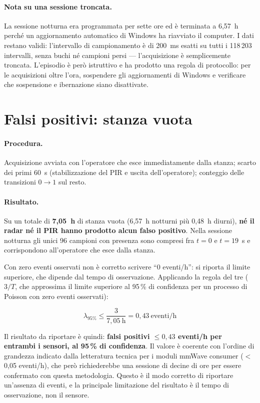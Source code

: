 \paragraph{Nota su una sessione troncata.} La sessione notturna era programmata per
sette ore ed è terminata a 6,57~h perché un aggiornamento automatico di Windows ha
riavviato il computer. I dati restano validi: l'intervallo di campionamento è di
200~ms esatti su tutti i 118\,203 intervalli, senza buchi né campioni persi ---
l'acquisizione è semplicemente troncata. L'episodio è però istruttivo e ha prodotto
una regola di protocollo: per le acquisizioni oltre l'ora, sospendere gli
aggiornamenti di Windows e verificare che sospensione e ibernazione siano disattivate.

\section{Falsi positivi: stanza vuota}
\label{sec:falsi-positivi}

\paragraph{Procedura.} Acquisizione avviata con l'operatore che esce immediatamente
dalla stanza; scarto dei primi 60~s (stabilizzazione del PIR e uscita
dell'operatore); conteggio delle transizioni $0 \to 1$ sul resto.

\paragraph{Risultato.} Su un totale di \textbf{7,05~h} di stanza vuota
(6,57~h notturni più 0,48~h diurni), \textbf{né il radar né il PIR hanno prodotto
alcun falso positivo}. Nella sessione notturna gli unici 96 campioni con presenza
sono compresi fra $t=0$ e $t=19$~s e corrispondono all'operatore che esce dalla
stanza.

Con zero eventi osservati non è corretto scrivere ``0 eventi/h'': si riporta il
limite superiore, che dipende dal tempo di osservazione. Applicando la regola del
tre ($3/T$, che approssima il limite superiore al 95\,\% di confidenza per un
processo di Poisson con zero eventi osservati):

\begin{equation}
\lambda_{95\%} \leq \frac{3}{7{,}05~\text{h}} = 0{,}43~\text{eventi/h}
\label{eq:regola-tre}
\end{equation}

Il risultato da riportare è quindi: \textbf{falsi positivi $\leq 0{,}43$ eventi/h
per entrambi i sensori, al 95\,\% di confidenza}. Il valore è coerente con l'ordine
di grandezza indicato dalla letteratura tecnica per i moduli mmWave consumer
($<$0,05 eventi/h), che però richiederebbe una sessione di decine di ore per essere
confermato con questa metodologia. Questo è il modo corretto di riportare
un'assenza di eventi, e la principale limitazione del risultato è il tempo di
osservazione, non il sensore.

